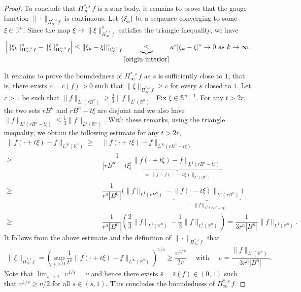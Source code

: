 \documentclass[11pt, reqno]{article}
\theoremstyle{definition}
\numberwithin{equation}{section}
\newcommand{\R}{\mathbb{R}}
\newcommand{\Sphere}{\mathbb{S}^{n - 1}}
\begin{document}
\begin{proof}
    \medskip
    
	To conclude that $\Pi^{\ast, s}_\infty \, f$ is a star body, it remains to prove that the gauge function $\| \cdot \|_{\Pi^{\ast, s}_\infty \, f}$ is continuous.
	Let $\{ \xi_k \}$ be a sequence converging to some $\xi \in \R^n$. 
 	Since the map $\xi \mapsto \| \xi \|_{\Pi^{\ast, s}_\infty \, f}^s$ satisfies the triangle inequality, we have
    \begin{align*}
        \Big\vert \| \xi_k \|_{\Pi^{\ast, s}_\infty \, f}^s - \| \xi \|_{\Pi^{\ast, s}_\infty \, f}^s \Big\vert
        \leq 
        \| \xi_k - \xi \|_{\Pi^{\ast, s}_\infty \, f}^s \underbrace{\, \leq \,}_{\eqref{origin-interior}} a^s | \xi_k - \xi|^s \to 0 \text{ as } k \to \infty.
    \end{align*}

    \medskip

    It remains to prove the boundedness of $\Pi^{\ast, s}_\infty \, f$ as $s$ is sufficiently close to $1$, that is, there exists $c = c(f) > 0$ such that $\| \xi \|_{\Pi^{\ast, s}_\infty \, f} \geq c$ for every $s$ closed to $1$.
    Let $r > 1$ be such that $\| f \|_{L^1(r B^n)} \geq \textstyle\frac{2}{3} \| f \|_{L^1(\R^n)}$.
    Fix $\xi \in \Sphere$.
    For any $t > 2r$, the two sets $rB^n$ and $rB^n - t\xi$ are disjoint and we also have $\| f \|_{L^1(rB^n - t\xi)} \leq \textstyle\frac{1}{3} \| f \|_{L^1(\R^n)}$.
    With these remarks, using the triangle inequality, we obtain the following estimate for any $t > 2r$,
    \begin{align*}
    	\| f(\cdot + t\xi) -  f\|_{L^\infty(\R^n)}
    	\geq & 
    	~ \| f(\cdot + t\xi) -  f\|_{L^\infty(rB^n - t\xi)} \\
    	\geq & 
    	~ \dfrac{1}{|rB^n - t\xi|} \underbrace{\| f(\cdot + t\xi)  - f \|_{L^1(rB^n - t\xi)} }_{\, = \, \| f - f(~\cdot~ - t \xi)\|_{L^1(rB^n)}} \\
    	\geq & 
    	~ \dfrac{1}{r^n |B^n|} \Big( \| f \|_{L^1(rB^n)} - \underbrace{\| f(\cdot - t\xi) \|_{L^1(rB^n)}}_{ \, = \, \| f \|_{L^1(rB^n - t\xi)} } \Big) 
     \\
    	\geq & 
    	~ \dfrac{1}{r^n |B^n|} \left( \dfrac{2}{3} \| f \|_{L^1(\R^n)} - \dfrac{1}{3} \| f \|_{L^1(\R^n)} \right) =  \dfrac{1}{3 r^n |B^n|} \| f \|_{L^1(\R^n)}.
    \end{align*}
    It follows from the above estimate and the definition of $\| \cdot \|_{\Pi^{\ast, s}_\infty \, f}$  that
	\begin{align*}
		\| \xi \|_{\Pi^{\ast, s}_\infty \, f} = \left( \sup_{t > 0} \dfrac{1}{t^s} \| f(\cdot + t\xi) - f \|_{L^\infty(\R^n)} \right)^{1/s} \geq \dfrac{\upsilon^{1/s}}{2r} 
		\quad \text{ with } \quad
		\upsilon = \dfrac{\| f \|_{L^1(\R^n)}}{3r^n |B^n|}.
	\end{align*}
	Note that $\textstyle\lim_{s \to 1^-} \upsilon^{1/s} = \upsilon$ and hence there exists $\bar s = \bar s(f) \in (0, 1)$ such that $\upsilon^{1/s} \geq \upsilon/2$ for all $s \in (\bar s, 1)$.
	This concludes the boundedness of $\Pi^{\ast, s}_\infty \, f$.
	

\end{proof}
\end{document}
